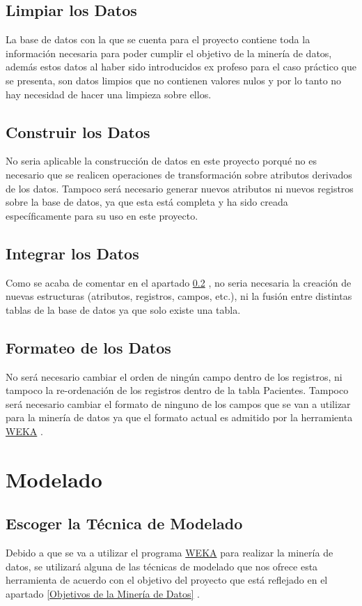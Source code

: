 \documentclass{article}
\begin{document}
\subsection{Limpiar los Datos}
La base de datos con la que se cuenta para el proyecto contiene toda la información necesaria para poder cumplir el objetivo de la minería de datos, además estos datos al haber sido introducidos ex profeso para el caso práctico que se presenta, son datos limpios que no contienen valores nulos y por lo tanto no hay necesidad de hacer una limpieza sobre ellos.

\subsection{Construir los Datos}\label{Construir los Datos}
No seria aplicable la construcción de datos en este proyecto porqué no es necesario que se realicen operaciones de transformación sobre atributos derivados de los datos. Tampoco será necesario generar nuevos atributos ni nuevos registros sobre la base de datos, ya que esta está completa y ha sido creada específicamente para su uso en este proyecto.

\subsection{Integrar los Datos}
Como se acaba de comentar en el apartado \ref{Construir los Datos} , no seria necesaria la creación de nuevas estructuras (atributos, registros, campos, etc.), ni la fusión entre distintas tablas de la base de datos ya que solo existe una tabla.

\subsection{Formateo de los Datos}
No será necesario cambiar el orden de ningún campo dentro de los registros, ni tampoco la re-ordenación de los registros dentro de la tabla Pacientes. Tampoco será necesario cambiar el formato de ninguno de los campos que se van a utilizar para la minería de datos ya que el formato actual es admitido por la herramienta \href{https://www.cs.waikato.ac.nz/~ml/weka/}{WEKA} .

\section{Modelado}

\subsection{Escoger la Técnica de Modelado}
Debido a que se va a utilizar el programa \href{https://www.cs.waikato.ac.nz/~ml/weka/}{WEKA} para realizar la minería de datos, se utilizará alguna de las técnicas de modelado que nos ofrece esta herramienta de acuerdo con el objetivo del proyecto que está reflejado en el apartado \ref{Objetivos de la Minería de Datos} .
\end{document}
